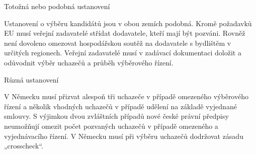 \documentclass[10pt]{article}
\begin{document}
Totožná nebo podobná ustanovení

Ustanovení o výběru kandidátů jsou v obou zemích podobná.
Kromě požadavků EU musí veřejní zadavatelé střídat dodavatele, kteří mají být pozváni.
Rovněž není dovoleno omezovat hospodářskou soutěž na dodavatele s bydlištěm v určitých regionech.
Veřejní zadavatelé musí v zadávací dokumentaci doložit a odůvodnit výběr uchazečů a průběh výběrového řízení.


Různá ustanovení

V Německu musí přizvat alespoň tři uchazeče v případě omezeného výběrového řízení a několik vhodných uchazečů v případě udělení na základě vyjednané smlouvy.
S výjimkou dvou zvláštních případů nové české právní předpisy neumožňují omezit počet pozvaných uchazečů v případě omezeného a vyjednávacího řízení.
V Německu musí při výběru uchazečů dodržovat zásadu „crosscheck“.
\end{document}
